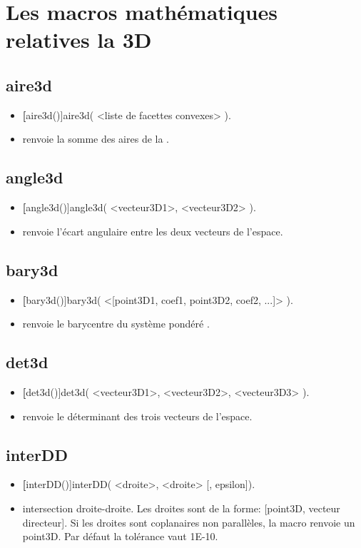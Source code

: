 \section{Les macros mathématiques relatives la 3D}

\subsection{aire3d}
\begin{itemize}
 \item \util \textbf[aire3d()]{aire3d( <liste de facettes convexes> )}.
 \item \desc renvoie la somme des aires de la .
\end{itemize}


\subsection{angle3d}
\begin{itemize}
 \item \util \textbf[angle3d()]{angle3d( <vecteur3D1>, <vecteur3D2> )}.
 \item \desc renvoie l'écart angulaire entre les deux vecteurs de l'espace.
\end{itemize}

\subsection{bary3d}
\begin{itemize}
 \item \util \textbf[bary3d()]{bary3d( <[point3D1, coef1, point3D2, coef2, ...]> )}.
 \item \desc renvoie le barycentre du système pondéré .
\end{itemize}


\subsection{det3d}
\begin{itemize}
 \item \util \textbf[det3d()]{det3d( <vecteur3D1>, <vecteur3D2>, <vecteur3D3> )}.
 \item \desc renvoie le déterminant des trois vecteurs de l'espace.
\end{itemize}

\subsection{interDD}
\begin{itemize}
 \item \util \textbf[interDD()]{interDD( <droite>, <droite> [, epsilon])}.
 \item \desc intersection droite-droite. Les droites sont de la forme: [point3D, vecteur directeur]. Si les droites sont coplanaires non parallèles, la macro renvoie un point3D. Par défaut la tolérance  vaut 1E-10.
\end{itemize}

